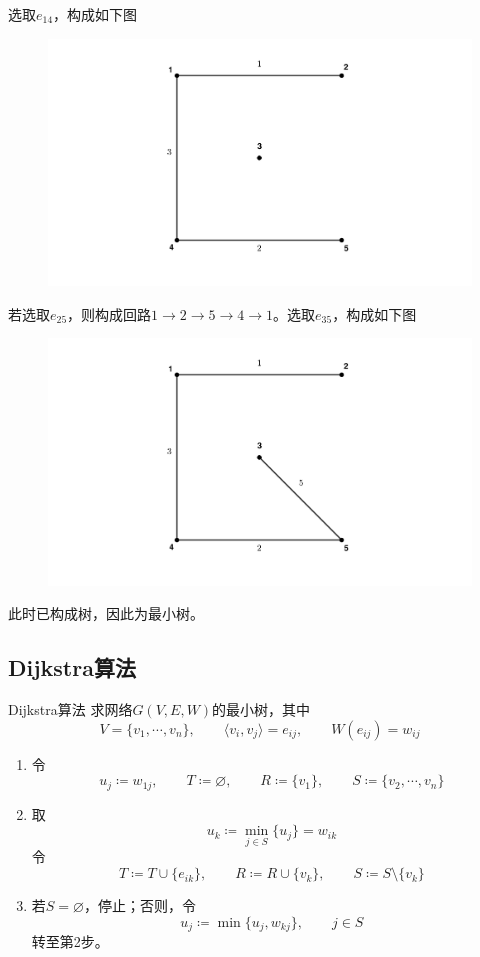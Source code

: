 \documentclass[lang = cn, scheme = chinese, thmcnt = section]{elegantbook}
\begin{document}
\begin{solution}
	选取$e_{14}$，构成如下图
	\begin{figure}[H]
		\centering
		\includegraphics[scale = 0.15]{../图/12.1.4}
	\end{figure}
	
	若选取$e_{25}$，则构成回路$1\to 2\to 5\to 4\to 1$。选取$e_{35}$，构成如下图
	\begin{figure}[H]
		\centering
		\includegraphics[scale = 0.15]{../图/12.1.5}
	\end{figure}
	此时已构成树，因此为最小树。
\end{solution}

\subsection{Dijkstra算法}

\begin{theorem}{Dijkstra算法}
	求网络$G(V,E,W)$的最小树，其中%
	$$
	V=\{ v_1,\cdots,v_n \},\qquad 
	\langle v_i,v_j \rangle = e_{ij},\qquad 
	W(e_{ij})=w_{ij}
	$$
	\begin{enumerate}
		\item 令%
		$$
		u_j\coloneqq w_{1j},\qquad 
		T\coloneqq \varnothing,\qquad
		R\coloneqq \{ v_1 \},\qquad 
		S\coloneqq \{ v_2,\cdots,v_n \}
		$$
		\item 取%
		$$
		u_k\coloneqq \min_{j\in S}\{ u_j \}=w_{ik}
		$$
		令%
		$$
		T\coloneqq T\cup\{ e_{ik} \},\qquad 
		R\coloneqq R\cup\{ v_k \},\qquad 
		S\coloneqq S\setminus\{ v_k \}
		$$
		\item 若$S=\varnothing$，停止；否则，令%
		$$
		u_j\coloneqq \min\{ u_j,w_{kj} \},\qquad j\in S
		$$
		转至第2步。
	\end{enumerate}
\end{theorem}
\end{document}
